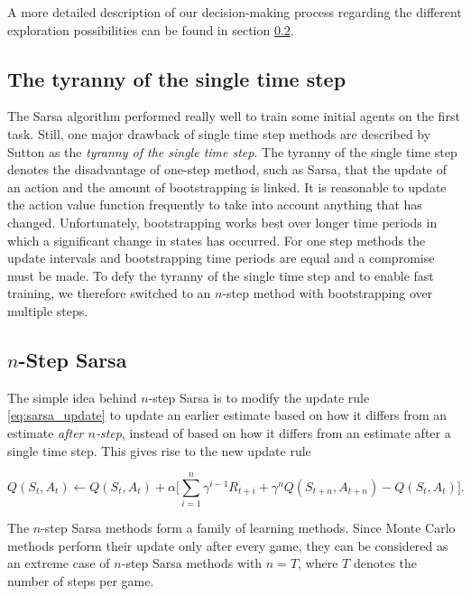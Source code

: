 A more detailed description of our decision-making process regarding the different exploration possibilities can be found in section \ref{}.

\subsection{The tyranny of the single time step}

The Sarsa algorithm performed really well to train some initial agents on the first task. Still, one major drawback of single time step methods are described by Sutton as the \emph{tyranny of the single time step}. The tyranny of the single time step denotes the disadvantage of one-step method, such as Sarsa, that the update of an action and the amount of bootstrapping is linked. It is reasonable to update the action value function frequently to take into account anything that has changed. Unfortunately, bootstrapping works best  over longer time periods in which a significant change in states has occurred. For one step methods the update intervals and bootstrapping time periods are equal and a compromise must be made. To defy the tyranny of the single time step and to enable fast training, we therefore switched to an $n$-step method with bootstrapping over multiple steps.

\subsection{$n$-Step Sarsa}

The simple idea behind $n$-step Sarsa is to modify the update rule \eqref{eq:sarsa_update} to update an earlier estimate based on how it differs from an  estimate \emph{after $n$-step}, instead of based on how it differs from an estimate after a single time step. This gives rise to the new update rule

\begin{equation} \label{eq:n_step_sarsa_update}
	Q(S_t, A_t) \leftarrow Q(S_t, A_t) + \alpha \big[\sum_{i=1}^n \gamma^{i-1}R_{t+i} + \gamma^n Q(S_{t+n}, A_{t+n}) - Q(S_t, A_t)\big].
\end{equation}

The $n$-step Sarsa methods form a family of learning methods. Since Monte Carlo methods perform their update only after every game, they can be considered as an extreme case of $n$-step Sarsa methods with $n = T$, where $T$ denotes the number of steps per game. 

